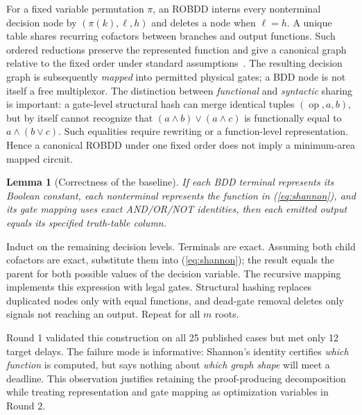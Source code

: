 \documentclass[journal,10pt]{IEEEtran}
\newtheorem{lemma}{Lemma}
\begin{document}
For a fixed variable permutation $\pi$, an ROBDD interns every nonterminal decision node by $(\pi(k),\ell,h)$ and deletes a node when $\ell=h$. A unique table shares recurring cofactors between branches and output functions. Such ordered reductions preserve the represented function and give a canonical graph relative to the fixed order under standard assumptions~\cite{bryant1986}. The resulting decision graph is subsequently \emph{mapped} into permitted physical gates; a BDD node is not itself a free multiplexor. The distinction between \emph{functional} and \emph{syntactic} sharing is important: a gate-level structural hash can merge identical tuples $(\operatorname{op},a,b)$, but by itself cannot recognize that $(a\land b)\lor(a\land c)$ is functionally equal to $a\land(b\lor c)$. Such equalities require rewriting or a function-level representation. Hence a canonical ROBDD under one fixed order does not imply a minimum-area mapped circuit.

\begin{lemma}[Correctness of the baseline]
If each BDD terminal represents its Boolean constant, each nonterminal represents the function in (\ref{eq:shannon}), and its gate mapping uses exact AND/OR/NOT identities, then each emitted output equals its specified truth-table column.
\end{lemma}
\begin{IEEEproof}
Induct on the remaining decision levels. Terminals are exact. Assuming both child cofactors are exact, substitute them into (\ref{eq:shannon}); the result equals the parent for both possible values of the decision variable. The recursive mapping implements this expression with legal gates. Structural hashing replaces duplicated nodes only with equal functions, and dead-gate removal deletes only signals not reaching an output. Repeat for all $m$ roots.
\end{IEEEproof}

Round 1 validated this construction on all 25 published cases but met only 12 target delays. The failure mode is informative: Shannon's identity certifies \emph{which function} is computed, but says nothing about \emph{which graph shape} will meet a deadline. This observation justifies retaining the proof-producing decomposition while treating representation and gate mapping as optimization variables in Round 2.
\end{document}
